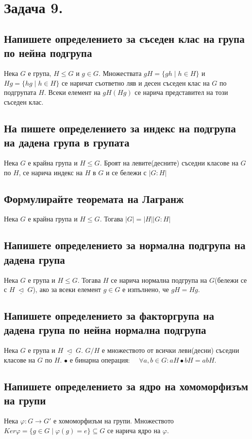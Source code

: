 \documentclass[10pt]{article}
\newcommand{\triq}{\; \underline{\triangleleft} \;}
\begin{document}
\section*{Задача 9.}

\subsection*{Напишете определението за съседен клас на група по нейна подгрупа}
Нека $G$ е група, $H \leq G$ и $g \in G$. Множествата $gH = \{gh \mid h \in H\}$ и $Hg = \{hg \mid h \in H\}$ се наричат съответно ляв и десен съседен клас на $G$ по подгрупата $H$. Всеки елемент на $gH(Hg)$ се нарича представител на този съседен клас.

\subsection*{На пишете определението за индекс на подгрупа на дадена група в групата}
Нека $G$ е крайна група и $H \leq G$. Броят на левите(десните) съседни класове на $G$ по $H$, се нарича индекс на $H$ в $G$ и се бележи с $|G:H|$

\subsection*{Формулирайте теоремата на Лагранж}
Нека $G$ е крайна група и $H \leq G$. Тогава $|G| = |H||G:H|$

\subsection*{Напишете определението за нормална подгрупа на дадена група}
Нека $G$ е група и $H \leq G$. Тогава $H$ се нарича нормална подгрупа на $G$(бележи се с $H \triq G$), ако за всеки елемент $g \in G$ е изпълнено, че $gH = Hg$.

\subsection*{Напишете определението за факторгрупа на дадена група по нейна нормална подгрупа}
Нека $G$ е група и $H \triq G$. $G/H$ е множеството от всички леви(десни) съседни класове на $G$ по $H$. $\bullet$ е бинарна операция: $\quad \forall a,b \in G: aH \bullet bH = abH$.

\subsection*{Напишете определението за ядро на хомоморфизъм на групи}
Нека $\varphi: G \to G'$ е хомоморфизъм на групи. Множеството $Ker\varphi = \{g \in G \mid \varphi(g) = e\} \subseteq G$ се нарича ядро на $\varphi$.
\end{document}
